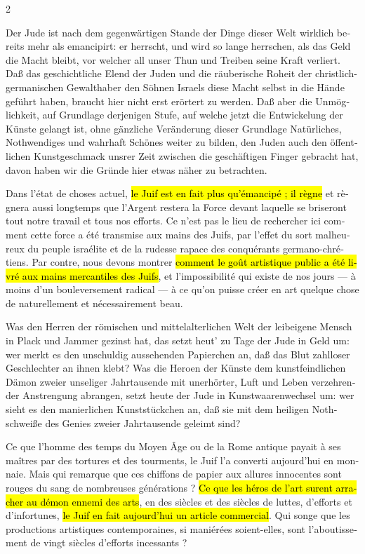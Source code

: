 \documentclass[a4paper,12pt]{article}
\newcommand\chunks[2]{%
\begin{leftcolumn*}\begin{otherlanguage}{german}%
{#1}%
\end{otherlanguage}\end{leftcolumn*}%
\begin{rightcolumn}\begin{otherlanguage}{french}%
{#2}%
\end{otherlanguage}\end{rightcolumn}%
}
\begin{document}
\begin{paracol}{2}
  \chunks{Der Jude ist nach dem gegenwärtigen Stande der Dinge dieser Welt wirklich bereits mehr als emancipirt: er herrscht, und wird so lange herrschen, als das Geld die Macht bleibt, vor welcher all unser Thun und Treiben seine Kraft verliert. Daß das geschichtliche Elend der Juden und die räuberische Roheit der christlich-germanischen Gewalthaber den Söhnen Israels diese Macht selbst in die Hände geführt haben, braucht hier nicht erst erörtert zu werden. Daß aber die Unmöglichkeit, auf Grundlage derjenigen Stufe, auf welche jetzt die Entwickelung der Künste gelangt ist, ohne gänzliche Veränderung dieser Grundlage Natürliches, Nothwendiges und wahrhaft Schönes weiter zu bilden, den Juden auch den öffentlichen Kunstgeschmack unsrer Zeit zwischen die geschäftigen Finger gebracht hat, davon haben wir die Gründe hier etwas näher zu betrachten.}
         {Dans l’état de choses actuel, \hl{le Juif est en fait plus qu’émancipé ; il règne} et règnera aussi longtemps que l’Argent restera la Force devant laquelle se briseront tout notre travail et tous nos efforts. Ce n’est pas le lieu de rechercher ici comment cette force a été transmise aux mains des Juifs, par l’effet du sort malheureux du peuple israélite et de la rudesse rapace des conquérants germano-\linebreak[4]chrétiens. Par contre, nous devons montrer \hl{comment le goût artistique public a été livré aux mains mercantiles des Juifs}, et l’impossibilité qui existe de nos jours --- à moins d’un bouleversement radical --- à ce qu’on puisse créer en art quelque chose de naturellement et nécessairement beau.}
  \chunks{Was den Herren der römischen und mittelalterlichen Welt der leibeigene Mensch in Plack und Jammer gezinst hat, das setzt heut’ zu Tage der Jude in Geld um: wer merkt es den unschuldig aussehenden Papierchen an, daß das Blut zahlloser Geschlechter an ihnen klebt? Was die Heroen der Künste dem kunstfeindlichen Dämon zweier unseliger Jahrtausende mit unerhörter, Luft und Leben verzehrender Anstrengung abrangen, setzt heute der Jude in Kunstwaarenwechsel um: wer sieht es den manierlichen Kunststückchen an, daß sie mit dem heiligen Nothschweiße des Genies zweier Jahrtausende geleimt sind?}
         {Ce que l’homme des temps du Moyen Âge ou de la Rome antique payait à ses maîtres par des tortures et des tourments, le Juif l’a converti aujourd’hui en monnaie. Mais qui remarque que ces chiffons de papier aux allures innocentes sont rouges du sang de nombreuses générations ? \hl{Ce que les héros de l’art surent arracher au démon ennemi des arts}, en des siècles et des siècles de luttes, d’efforts et d’infortunes, \hl{le Juif en fait aujourd’hui un article commercial}. Qui songe que les productions artistiques contemporaines, si maniérées soient-elles, sont l’aboutissement de vingt siècles d’efforts incessants ?}

\end{paracol}
\end{document}
